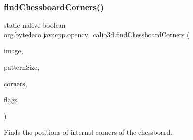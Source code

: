 \subsubsection{\texorpdfstring{find\+Chessboard\+Corners()}{findChessboardCorners()}}
{\footnotesize\ttfamily static native boolean org.\+bytedeco.\+javacpp.\+opencv\+\_\+calib3d.\+find\+Chessboard\+Corners (\begin{DoxyParamCaption}\item[{@By\+Val Mat}]{image,  }\item[{@By\+Val Size}]{pattern\+Size,  }\item[{@By\+Val Mat}]{corners,  }\item[{int}]{flags }\end{DoxyParamCaption})\hspace{0.3cm}{\ttfamily [static]}}



Finds the positions of internal corners of the chessboard. 


